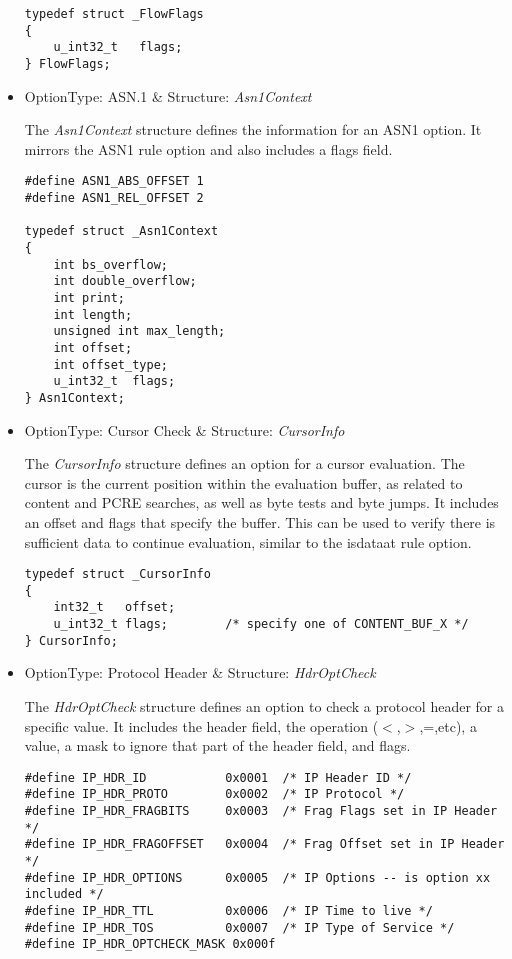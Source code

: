 \documentclass[english]{report}
\begin{document}
\begin{itemize}
\begin{verbatim}
typedef struct _FlowFlags
{
    u_int32_t   flags;
} FlowFlags;
\end{verbatim}

\item {OptionType: ASN.1 \& Structure: {\em Asn1Context}}

The {\em Asn1Context} structure defines the information for an ASN1 option.  It
mirrors the ASN1 rule option and also includes a flags field.

\begin{verbatim}
#define ASN1_ABS_OFFSET 1
#define ASN1_REL_OFFSET 2

typedef struct _Asn1Context
{
    int bs_overflow;
    int double_overflow;
    int print;
    int length;
    unsigned int max_length;
    int offset;
    int offset_type;
    u_int32_t  flags;
} Asn1Context;
\end{verbatim}

\item {OptionType: Cursor Check \& Structure: {\em CursorInfo}}

The {\em CursorInfo} structure defines an option for a cursor evaluation.  The
cursor is the current position within the evaluation buffer, as related to
content and PCRE searches, as well as byte tests and byte jumps.  It includes
an offset and flags that specify the buffer.  This can be used to verify there
is sufficient data to continue evaluation, similar to the isdataat rule option.  

\begin{verbatim}
typedef struct _CursorInfo
{
    int32_t   offset;
    u_int32_t flags;        /* specify one of CONTENT_BUF_X */
} CursorInfo;
\end{verbatim}

\item {OptionType: Protocol Header \& Structure: {\em HdrOptCheck}}

The {\em HdrOptCheck} structure defines an option to check a protocol header
for a specific value.  It includes the header field, the operation ($<$,$>$,=,etc),
a value, a mask to ignore that part of the header field, and flags.

\begin{verbatim}
#define IP_HDR_ID           0x0001  /* IP Header ID */
#define IP_HDR_PROTO        0x0002  /* IP Protocol */
#define IP_HDR_FRAGBITS     0x0003  /* Frag Flags set in IP Header */
#define IP_HDR_FRAGOFFSET   0x0004  /* Frag Offset set in IP Header */
#define IP_HDR_OPTIONS      0x0005  /* IP Options -- is option xx included */
#define IP_HDR_TTL          0x0006  /* IP Time to live */
#define IP_HDR_TOS          0x0007  /* IP Type of Service */
#define IP_HDR_OPTCHECK_MASK 0x000f


\end{verbatim}
\end{itemize}
\end{document}
